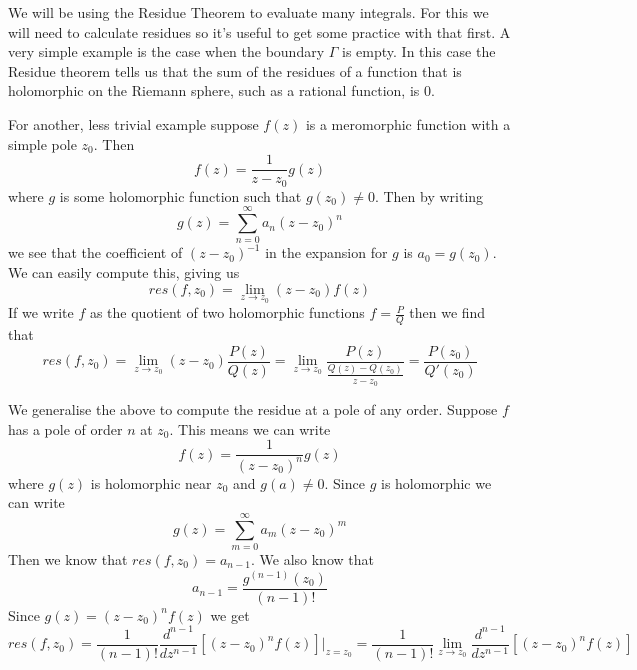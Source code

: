 We will be using the Residue Theorem to evaluate many integrals. For this we will need to calculate residues so it's useful to get some practice with that first. A very simple example is the case when the boundary $\Gamma$ is empty. In this case the Residue theorem tells us that the sum of the residues of a function that is holomorphic on the Riemann sphere, such as a rational function, is 0.

\begin{example}\label{eg:residue-of-quotient}
For another, less trivial example suppose $f(z)$ is a meromorphic function with a simple pole $z_0$. Then
$$f(z) = \frac{1}{z - z_0}g(z)$$
where $g$ is some holomorphic function such that $g(z_0) \neq 0$. Then by writing 
$$g(z) = \sum_{n = 0}^\infty a_n (z - z_0)^n$$
we see that the coefficient of $(z - z_0)^{-1}$ in the expansion for $g$ is $a_0 = g(z_0)$. We can easily compute this, giving us
$$res(f, z_0) = \lim_{z \to z_0} (z - z_0)f(z)$$
If we write $f$ as the quotient of two holomorphic functions $f = \frac{P}{Q}$ then we find that
$$res(f, z_0) = \lim_{z \to z_0} (z - z_0) \frac{P(z)}{Q(z)} = \lim_{z \to z_0} \frac{P(z)}{\frac{Q(z) - Q(z_0)}{z - z_0}} = \frac{P(z_0)}{Q'(z_0)} $$
\end{example}
\begin{example}
    We generalise the above to compute the residue at a pole of any order.
    Suppose $f$ has a pole of order $n$ at $z_0$. This means we can write
    $$f(z) = \frac{1}{(z - z_0)^n} g(z)$$
    where $g(z)$ is holomorphic near $z_0$ and $g(a) \neq 0$. Since $g$ is holomorphic we can write
    $$g(z) = \sum_{m = 0}^\infty a_m (z - z_0)^m$$
    Then we know that $res(f, z_0) = a_{n - 1}$. We also know that
    $$ a_{n - 1} = \frac{g^{(n - 1)}(z_0)}{(n - 1)!} $$
    Since $g(z) = (z - z_0)^n f(z)$ we get
    $$res(f, z_0) = \frac{1}{(n - 1)!} \frac{d^{n - 1}}{dz^{n - 1}}[(z - z_0)^n f(z)]\bigg|_{z = z_0} = \frac{1}{(n - 1)!} \lim_{z \to z_0} \frac{d^{n - 1}}{dz^{n - 1}} [(z - z_0)^n f(z)]$$
    
\end{example}
